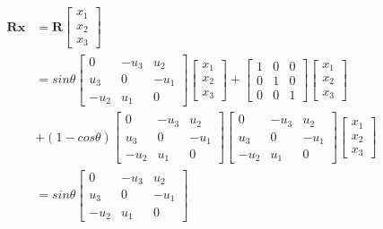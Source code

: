 \documentclass[letterpaper, 11pt]{article}
\begin{document}
\begin{align*}
    \textbf{R}\textbf{x}
     & =
    \textbf{R}
    \begin{bmatrix}
        x_1 \\
        x_2 \\
        x_3
    \end{bmatrix}     \\
     & =
    sin\theta
    \begin{bmatrix}
        0    & -u_3 & u_2  \\
        u_3  & 0    & -u_1 \\
        -u_2 & u_1  & 0
    \end{bmatrix}
    \begin{bmatrix}
        x_1 \\
        x_2 \\
        x_3
    \end{bmatrix}
    +
    \begin{bmatrix} 1 & 0 & 0 \\ 0 & 1 & 0 \\ 0 & 0 & 1 \end{bmatrix}
    \begin{bmatrix}
        x_1 \\
        x_2 \\
        x_3
    \end{bmatrix}     \\
     & + (1-cos\theta)
    \begin{bmatrix}
        0    & -u_3 & u_2  \\
        u_3  & 0    & -u_1 \\
        -u_2 & u_1  & 0
    \end{bmatrix}
    \begin{bmatrix}
        0    & -u_3 & u_2  \\
        u_3  & 0    & -u_1 \\
        -u_2 & u_1  & 0
    \end{bmatrix}
    \begin{bmatrix}
        x_1 \\
        x_2 \\
        x_3
    \end{bmatrix}     \\
     & =
    sin\theta
    \begin{bmatrix}
        0    & -u_3 & u_2  \\
        u_3  & 0    & -u_1 \\
        -u_2 & u_1  & 0
    \end{bmatrix}

\end{align*}
\end{document}
